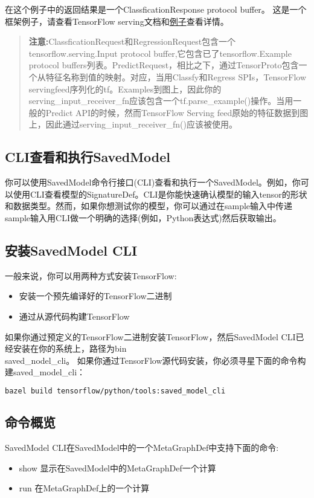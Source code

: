 在这个例子中的返回结果是一个ClassficationResponse protocol buffer。
这是一个框架例子，请查看TensorFlow serving文档和\href{https://github.com/tensorflow/serving/tree/master/tensorflow_serving/example}{例子}查看详情。
\begin{quote}
\textbf{注意:}ClassficationRequest和RegressionRequest包含一个tensorflow.serving.Input protocol buffer,它包含已了tensorflow.Example protocol buffers列表。PredictRequest，相比之下，通过TensorProto包含一个从特征名称到值的映射。对应，当用Classfy和Regress SPIs，TensorFlow servingfeed序列化的tf。Examples到图上，因此你的serving\_input\_receiver\_fn应该包含一个tf.parse\_example()操作。当用一般的Predict API的时候，然而TensorFlow Serving feed原始的特征数据到图上，因此通过serving\_input\_receiver\_fn()应该被使用。
\end{quote}
\subsection{CLI查看和执行SavedModel}
你可以使用SavedModel命令行接口(CLI)查看和执行一个SavedModel。例如，你可以使用CLI查看模型的SignatureDef。CLI是你能快速确认模型的输入tensor的形状和数据类型。然而，如果你想测试你的模型，你可以通过在sample输入中传递sample输入用CLI做一个明确的选择(例如，Python表达式)然后获取输出。
\subsection{安装SavedModel CLI}
一般来说，你可以用两种方式安装TensorFlow:
\begin{itemize}
\item 安装一个预先编译好的TensorFlow二进制
\item 通过从源代码构建TensorFlow 
\end{itemize}
如果你通过预定义的TensorFlow二进制安装TensorFlow，然后SavedModel CLI已经安装在你的系统上，路径为bin\\saved\_nodel\_cli。
如果你通过TensorFlow源代码安装，你必须寻星下面的命令构建saved\_model\_cli：
\begin{lstlisting}[language=Bash]
bazel build tensorflow/python/tools:saved_model_cli
\end{lstlisting}
\subsection{命令概览}
SavedModel CLI在SavedModel中的一个MetaGraphDef中支持下面的命令:
\begin{itemize}
\item show 显示在SavedModel中的MetaGraphDef一个计算
\item run 在MetaGraphDef上的一个计算
\end{itemize}
